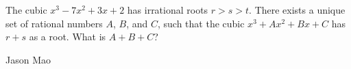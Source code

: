 The cubic $x^3 - 7x^2 + 3x + 2$ has irrational roots $r > s > t$. There exists a unique set of rational numbers $A$, $B$, and $C$, such that the cubic $x^3 + Ax^2 + Bx + C$ has $r+s$ as a root. What is $A+B+C$?

Jason Mao
